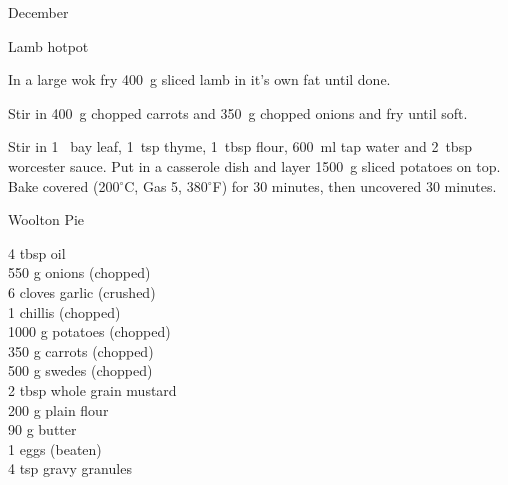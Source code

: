 \begin{menu}{December}
\begin{recipe}{2}{Lamb hotpot}
    \begin{instructions}
    \item 
        In a large wok fry
        400~g sliced lamb
        in it's own fat until done.
      \item 
        Stir in
        400~g chopped carrots
        and
        350~g chopped onions
        and fry until soft.
      \item 
        Stir in
        1~  bay leaf,
        1~tsp  thyme,
        1~tbsp  flour,
        600~ml  tap water
        and
        2~tbsp  worcester sauce.
        Put in a casserole dish and
        layer 1500~g sliced potatoes on top.
        Bake covered (200$^{\circ}$C, Gas 5, 380$^{\circ}$F)
        for 30 minutes,
        then uncovered 30 minutes.
      
    \end{instructions}
    \end{recipe}%
  
    \begin{recipe}{2}{Woolton Pie}%
		\begin{ingredients}
		4 tbsp oil  \\
	550 g onions (chopped) \\
	6 cloves garlic (crushed) \\
	1  chillis (chopped) \\
	1000 g potatoes (chopped) \\
	350 g carrots (chopped) \\
	500 g swedes (chopped) \\
	2 tbsp whole grain mustard  \\
	200 g plain flour  \\
	90 g butter  \\
	1  eggs (beaten) \\
	4 tsp gravy granules  \\
	
		\end{ingredients}
	

\end{recipe}
\end{menu}
